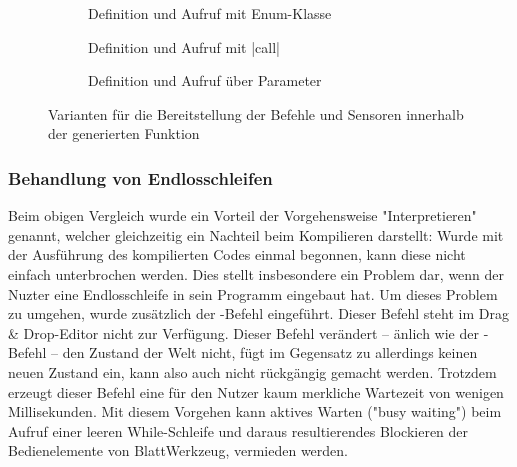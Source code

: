\begin{figure}
  \begin{subfigure}[b]{\textwidth}
    
    \caption{Definition und Aufruf mit Enum-Klasse}
    \label{fig:implementation:program:environment:func}
    \vspace{0.5cm}
  \end{subfigure}
  \begin{subfigure}[b]{\textwidth}
    
    \caption{Definition und Aufruf mit \inlinec|call|}
    \label{fig:implementation:program:environment:this}
    \vspace{0.5cm}
  \end{subfigure}
  \begin{subfigure}[b]{\textwidth}
    
    \caption{Definition und Aufruf über Parameter}
    \label{fig:implementation:program:environment:param}
  \end{subfigure}
  \caption{Varianten für die Bereitstellung der Befehle und Sensoren innerhalb der generierten Funktion}
  \label{fig:implementation:program:environment}
\end{figure}

\subsubsection{Behandlung von Endlosschleifen}

Beim obigen Vergleich wurde ein Vorteil der Vorgehensweise "Interpretieren" genannt, welcher gleichzeitig ein Nachteil beim Kompilieren darstellt: Wurde mit der Ausführung des kompilierten Codes einmal begonnen, kann diese nicht einfach unterbrochen werden. Dies stellt insbesondere ein Problem dar, wenn der Nuzter eine Endlosschleife in sein Programm eingebaut hat. Um dieses Problem zu umgehen, wurde zusätzlich der -Befehl eingeführt. Dieser Befehl steht im Drag \& Drop-Editor nicht zur Verfügung. Dieser Befehl verändert -- änlich wie der -Befehl -- den Zustand der Welt nicht, fügt im Gegensatz zu  allerdings keinen neuen Zustand ein, kann also auch nicht rückgängig gemacht werden. Trotzdem erzeugt dieser Befehl eine für den Nutzer kaum merkliche Wartezeit von wenigen Millisekunden. Mit diesem Vorgehen kann aktives Warten ("busy waiting") beim Aufruf einer leeren While-Schleife und daraus resultierendes Blockieren der Bedienelemente von BlattWerkzeug, vermieden werden.

